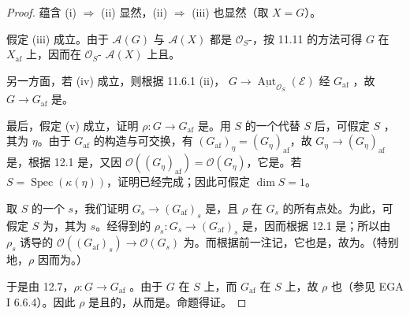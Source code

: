 \begin{proof}
蕴含 (i) $\Rightarrow$ (ii) 显然，(ii) $\Rightarrow$ (iii) 也显然（取 $X=G$）。

假定 (iii) 成立。由于 $\mathscr A(G)$ 与 $\mathscr A(X)$ 都是 $\mathcal O_S$-，按 11.11 的方法可得 $G$ 在 $X_{\mathrm{af}}$ 上，因而在 $\mathcal O_S$- $\mathscr A(X)$ 上且。

另一方面，若 (iv) 成立，则根据 11.6.1 (ii)， $G\to\underline{\operatorname{Aut}}_{\mathcal O_S}(\mathcal E)$ 经 $G_{\mathrm{af}}$ ，故 $G\to G_{\mathrm{af}}$ 是。

最后，假定 (v) 成立，证明 $\rho:G\to G_{\mathrm{af}}$ 是。用 $S$ 的一个代替 $S$ 后，可假定 $S$ ，其为 $\eta$。由于 $G_{\mathrm{af}}$ 的构造与可交换，有 $(G_{\mathrm{af}})_\eta=(G_\eta)_{\mathrm{af}}$，故 $G_\eta\to(G_\eta)_{\mathrm{af}}$ 是，根据 12.1 是，又因 $\mathcal O((G_\eta)_{\mathrm{af}})=\mathcal O(G_\eta)$，它是。若 $S=\operatorname{Spec}(\kappa(\eta))$，证明已经完成；因此可假定 $\dim S=1$。

取 $S$ 的一个 $s$，我们证明 $G_s\to(G_{\mathrm{af}})_s$ 是，且 $\rho$ 在 $G_s$ 的所有点处。为此，可假定 $S$ 为，其为 $s$。经得到的 $\rho_s:G_s\to(G_{\mathrm{af}})_s$ 是，因而根据 12.1 是；所以由 $\rho_s$ 诱导的 $\mathcal O((G_{\mathrm{af}})_s)\to\mathcal O(G_s)$ 为。而根据前一注记，它也是，故为。（特别地，$\rho$ 因而为。）

于是由 12.7，$\rho:G\to G_{\mathrm{af}}$ 。由于 $G$ 在 $S$ 上，而 $G_{\mathrm{af}}$ 在 $S$ 上，故 $\rho$ 也（参见 EGA I 6.6.4）。因此 $\rho$ 是且的，从而是。命题得证。
\end{proof}

